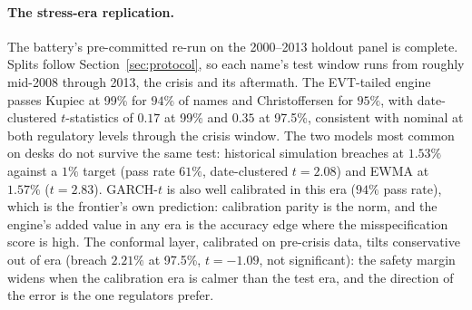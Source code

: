 \documentclass[11pt]{article}
\theoremstyle{remark}
\begin{document}
\paragraph{The stress-era replication.} The battery's pre-committed
re-run on the 2000--2013 holdout panel is complete. Splits follow
Section~\ref{sec:protocol}, so each name's test window runs from
roughly mid-2008 through 2013, the crisis and its aftermath. The
EVT-tailed engine passes Kupiec at 99\% for $94\%$ of names and
Christoffersen for $95\%$, with date-clustered $t$-statistics of
$0.17$ at 99\% and $0.35$ at 97.5\%, consistent with nominal at both regulatory levels through the crisis window. The two models most
common on desks do not survive the same test: historical simulation
breaches at $1.53\%$ against a $1\%$ target (pass rate $61\%$,
date-clustered $t=2.08$) and EWMA at $1.57\%$ ($t=2.83$). GARCH-$t$ is
also well calibrated in this era ($94\%$ pass rate), which is the frontier's own prediction: calibration parity is the norm, and the
engine's added value in any era is the accuracy edge where the
misspecification score is high. The conformal layer, calibrated on
pre-crisis data, tilts conservative out of era (breach $2.21\%$ at
97.5\%, $t=-1.09$, not significant): the safety margin widens when the
calibration era is calmer than the test era, and the direction of the
error is the one regulators prefer.
\end{document}
